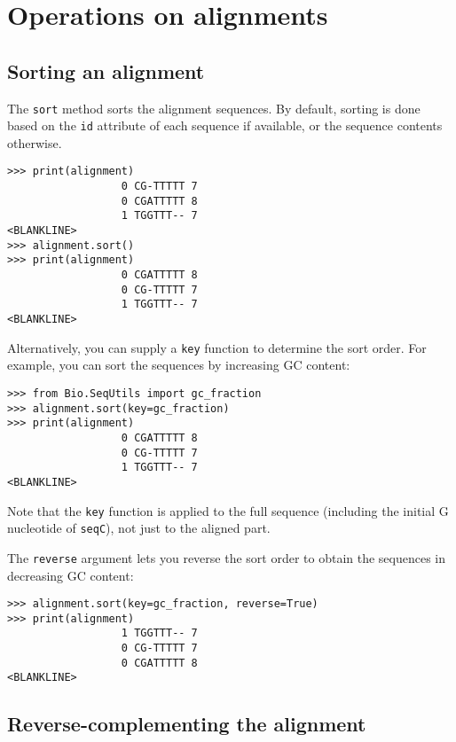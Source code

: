 \section{Operations on alignments}

\subsection{Sorting an alignment}

The \verb+sort+ method sorts the alignment sequences. By default, sorting is done based on the \verb+id+ attribute of each sequence if available, or the sequence contents otherwise.
\begin{verbatim}
>>> print(alignment)
                  0 CG-TTTTT 7
                  0 CGATTTTT 8
                  1 TGGTTT-- 7
<BLANKLINE>
>>> alignment.sort()
>>> print(alignment)
                  0 CGATTTTT 8
                  0 CG-TTTTT 7
                  1 TGGTTT-- 7
<BLANKLINE>
\end{verbatim}
Alternatively, you can supply a \verb+key+ function to determine the sort order. For example, you can sort the sequences by increasing GC content:
\begin{verbatim}
>>> from Bio.SeqUtils import gc_fraction
>>> alignment.sort(key=gc_fraction)
>>> print(alignment)
                  0 CGATTTTT 8
                  0 CG-TTTTT 7
                  1 TGGTTT-- 7
<BLANKLINE>
\end{verbatim}
Note that the \verb+key+ function is applied to the full sequence (including the initial G nucleotide of \verb|seqC|), not just to the aligned part.

The \verb+reverse+ argument lets you reverse the sort order to obtain the sequences in decreasing GC content:
\begin{verbatim}
>>> alignment.sort(key=gc_fraction, reverse=True)
>>> print(alignment)
                  1 TGGTTT-- 7
                  0 CG-TTTTT 7
                  0 CGATTTTT 8
<BLANKLINE>
\end{verbatim}

\subsection{Reverse-complementing the alignment}

